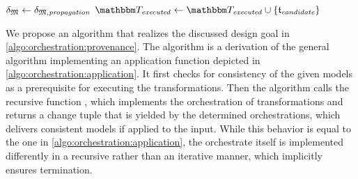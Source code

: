 \begin{algorithm}
\begin{algorithmic}[1]
            \State $\mathfrak{\delta}_{\mathfrak{M}} \gets \mathfrak{\delta}_{\mathfrak{M},\mathit{propagation}}$
            \State $\provalgexecuted \gets \provalgexecuted \cup \setted{\provalgcandidate}$ \label{algo:orchestration:provenance:line:executed_update}
        \EndFor
        \State {}
    \EndProcedure
    \end{algorithmic}
	
\end{algorithm}


We propose an algorithm that realizes the discussed design goal in \autoref{algo:orchestration:provenance}.
The algorithm is a derivation of the general algorithm implementing an application function depicted in \autoref{algo:orchestration:application}.
It first checks for consistency of the given models as a prerequisite for executing the transformations.
Then the algorithm calls the recursive function , which implements the orchestration of transformations and returns a change tuple that is yielded by the determined orchestrations, which delivers consistent models if applied to the input.
While this behavior is equal to the one in \autoref{algo:orchestration:application}, the orchestrate itself is implemented differently in a recursive rather than an iterative manner, which implicitly ensures termination.

